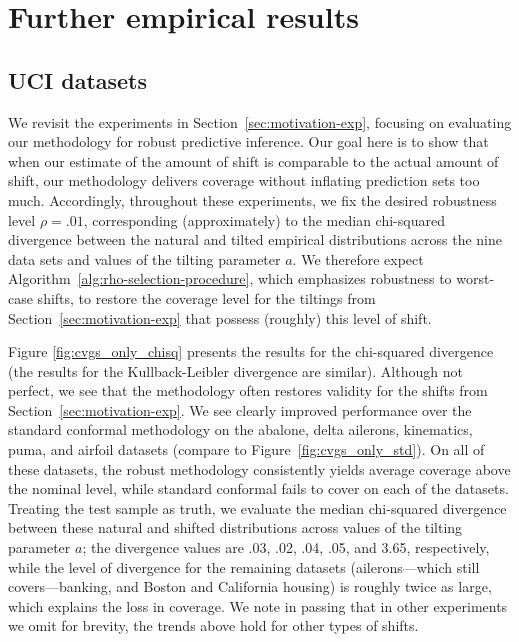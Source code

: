 \section{Further empirical results}

\subsection{UCI datasets}
\label{sec:uci-experiments}

We revisit the experiments in Section~\ref{sec:motivation-exp}, focusing on
evaluating our methodology for robust predictive inference.  Our goal here
is to show that when our estimate of the amount of shift is comparable to
the actual amount of shift, our methodology delivers coverage without
inflating prediction sets too much.  Accordingly, throughout these
experiments, we fix the desired robustness level $\rho = .01$, corresponding
(approximately) to the median chi-squared divergence between the natural and
tilted empirical distributions across the nine data sets and values of the
tilting parameter $a$.  We therefore expect
Algorithm~\ref{alg:rho-selection-procedure}, which emphasizes robustness to
worst-case shifts, to restore the coverage level for the tiltings from
Section~\ref{sec:motivation-exp} that possess (roughly) this level of shift.

Figure \ref{fig:cvgs_only_chisq} presents the results for the chi-squared
divergence (the results for the Kullback-Leibler divergence are similar).
Although not perfect, we see that the methodology often restores validity
for the shifts from Section~\ref{sec:motivation-exp}.  We see clearly
improved performance over the standard conformal methodology on the abalone,
delta ailerons, kinematics, puma, and airfoil datasets (compare to
Figure~\ref{fig:cvgs_only_std}).  On all of these datasets, the robust
methodology consistently yields average coverage above the nominal level,
while standard conformal fails to cover on each of the datasets.  Treating
the test sample as truth, we evaluate the median chi-squared divergence
between these natural and shifted distributions across values of the tilting
parameter $a$; the divergence values are .03, .02, .04, .05, and 3.65,
respectively, while the level of divergence for the remaining datasets
(ailerons---which still covers---banking, and Boston and California housing)
is roughly twice as large, which explains the loss in coverage.  We note in
passing that in other experiments we omit for brevity, the trends above hold
for other types of shifts.

